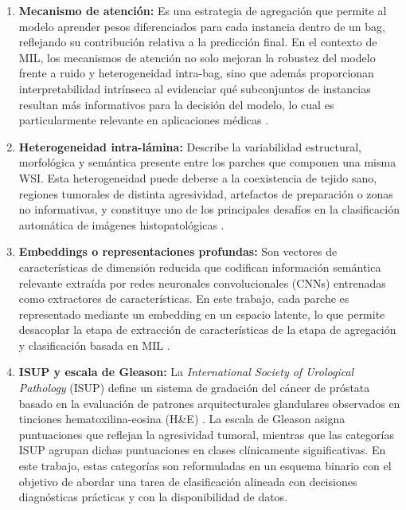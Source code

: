 \begin{enumerate}
    \item \textbf{Mecanismo de atención:} Es una estrategia de agregación que permite al modelo aprender pesos diferenciados para cada instancia dentro de un bag, reflejando su contribución relativa a la predicción final. En el contexto de MIL, los mecanismos de atención no solo mejoran la robustez del modelo frente a ruido y heterogeneidad intra-bag, sino que además proporcionan interpretabilidad intrínseca al evidenciar qué subconjuntos de instancias resultan más informativos para la decisión del modelo, lo cual es particularmente relevante en aplicaciones médicas \cite{ilse2018attention} \cite{lu2021data}.

    \item \textbf{Heterogeneidad intra-lámina:} Describe la variabilidad estructural, morfológica y semántica presente entre los parches que componen una misma WSI. Esta heterogeneidad puede deberse a la coexistencia de tejido sano, regiones tumorales de distinta agresividad, artefactos de preparación o zonas no informativas, y constituye uno de los principales desafíos en la clasificación automática de imágenes histopatológicas \cite{GADERMAYR2024102337}.

    \item \textbf{Embeddings o representaciones profundas:} Son vectores de características de dimensión reducida que codifican información semántica relevante extraída por redes neuronales convolucionales (CNNs) entrenadas como extractores de características. En este trabajo, cada parche es representado mediante un embedding en un espacio latente, lo que permite desacoplar la etapa de extracción de características de la etapa de agregación y clasificación basada en MIL \cite{litjens2017survey}.

    \item \textbf{ISUP y escala de Gleason:} La \emph{International Society of Urological Pathology} (ISUP) define un sistema de gradación del cáncer de próstata basado en la evaluación de patrones arquitecturales glandulares observados en tinciones hematoxilina-eosina (H\&E) \cite{SILVARODRIGUEZ2020105637} \cite{epstein2016gleason}. La escala de Gleason asigna puntuaciones que reflejan la agresividad tumoral, mientras que las categorías ISUP agrupan dichas puntuaciones en clases clínicamente significativas. En este trabajo, estas categorías son reformuladas en un esquema binario con el objetivo de abordar una tarea de clasificación alineada con decisiones diagnósticas prácticas y con la disponibilidad de datos.


\end{enumerate}
